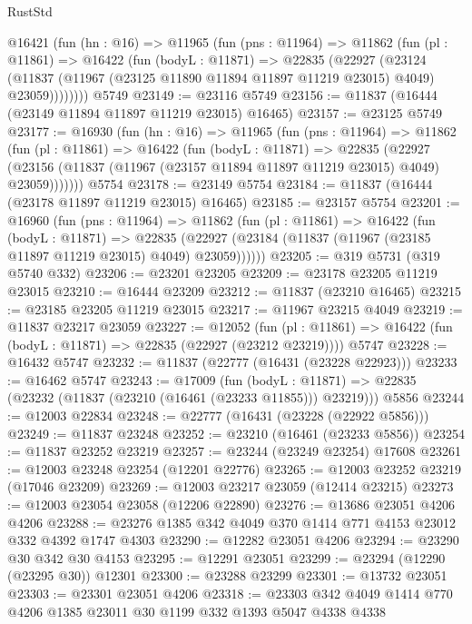 \begin{lexlean}{RustStd}
\begin{coremodule}
{\begin{coremodule}
{{{{{{{{{{{{{{{{{{{{{{{{{{{{{{{{{{{{{{{{{{{{{{{{{{    @16421
      (fun (hn : @16) =>
      @11965
        (fun (pns : @11964) =>
        @11862
          (fun (pl : @11861) =>
          @16422
            (fun (bodyL : @11871) =>
            @22835
              (@22927
                (@23124
                  (@11837 (@11967 (@23125 @11890 @11894 @11897 @11219 @23015) @4049) @23059))))))))
    @5749
@23149 := @23116 @5749
@23156 := @11837 (@16444 (@23149 @11894 @11897 @11219 @23015) @16465)
@23157 := @23125 @5749
@23177 := @16930
    (fun (hn : @16) =>
    @11965
      (fun (pns : @11964) =>
      @11862
        (fun (pl : @11861) =>
        @16422
          (fun (bodyL : @11871) =>
          @22835
            (@22927
              (@23156 (@11837 (@11967 (@23157 @11894 @11897 @11219 @23015) @4049) @23059)))))))
    @5754
@23178 := @23149 @5754
@23184 := @11837 (@16444 (@23178 @11897 @11219 @23015) @16465)
@23185 := @23157 @5754
@23201 := @16960
    (fun (pns : @11964) =>
    @11862
      (fun (pl : @11861) =>
      @16422
        (fun (bodyL : @11871) =>
        @22835 (@22927 (@23184 (@11837 (@11967 (@23185 @11897 @11219 @23015) @4049) @23059))))))
@23205 := @319 @5731 (@319 @5740 @332)
@23206 := @23201 @23205
@23209 := @23178 @23205 @11219 @23015
@23210 := @16444 @23209
@23212 := @11837 (@23210 @16465)
@23215 := @23185 @23205 @11219 @23015
@23217 := @11967 @23215 @4049
@23219 := @11837 @23217 @23059
@23227 := @12052
    (fun (pl : @11861) => @16422 (fun (bodyL : @11871) => @22835 (@22927 (@23212 @23219))))
    @5747
@23228 := @16432 @5747
@23232 := @11837 (@22777 (@16431 (@23228 @22923)))
@23233 := @16462 @5747
@23243 := @17009
    (fun (bodyL : @11871) => @22835 (@23232 (@11837 (@23210 (@16461 (@23233 @11855))) @23219)))
    @5856
@23244 := @12003 @22834
@23248 := @22777 (@16431 (@23228 (@22922 @5856)))
@23249 := @11837 @23248
@23252 := @23210 (@16461 (@23233 @5856))
@23254 := @11837 @23252 @23219
@23257 := @23244 (@23249 @23254) @17608
@23261 := @12003 @23248 @23254 (@12201 @22776)
@23265 := @12003 @23252 @23219 (@17046 @23209)
@23269 := @12003 @23217 @23059 (@12414 @23215)
@23273 := @12003 @23054 @23058 (@12206 @22890)
@23276 := @13686 @23051 @4206 @4206
@23288 := @23276 @1385 @342 @4049 @370 @1414 @771 @4153 @23012 @332 @4392 @1747 @4303
@23290 := @12282 @23051 @4206
@23294 := @23290 @30 @342 @30 @4153
@23295 := @12291 @23051
@23299 := @23294 (@12290 (@23295 @30)) @12301
@23300 := @23288 @23299
@23301 := @13732 @23051
@23303 := @23301 @23051 @4206
@23318 := @23303
    @342
    @4049
    @1414
    @770
    @4206
    @1385
    @23011
    @30
    @1199
    @332
    @1393
    @5047
    @4338
    @4338
}}}}}}}}}}}}}}}}}}}}}}}}}}}}}}}}}}}}}}}}}}}}}}}}}}
\end{coremodule}}
\end{coremodule}
\end{lexlean}
